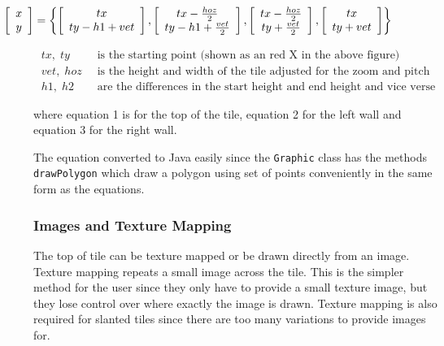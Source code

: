 \begin{equation}
\hspace{-2.5cm} \left[ \begin{array}{c} x \\ y \end{array} \right]=\left\{ \left[ \begin{array}{c} tx \\ ty-h1+vet \end{array} \right],\left[ \begin{array}{c} tx-\frac{hoz}{2} \\ ty-h1+\frac{vet}{2} \end{array} \right],\left[ \begin{array}{c} tx-\frac{hoz}{2} \\ ty+\frac{vet}{2} \end{array} \right],\left[ \begin{array}{c} tx \\ ty+vet \end{array} \right] \right\}
\end{equation}

\begin{align*}
	tx,\; ty   &\;\; \textrm{is the starting point (shown as an red X in the above figure)}\\
	vet,\; hoz &\;\; \textrm{is the height and width of the tile adjusted for  the zoom and pitch}\\
	h1,\; h2   &\;\; \textrm{are the differences in the start height and end height and vice verse}
\end{align*}

where equation 1 is for the top of the tile, equation 2 for the left wall and equation 3 for the right wall. 

The equation converted to Java easily since the \texttt{Graphic} class has the methods  \texttt{drawPolygon} which draw a polygon using set of points conveniently in the same form as the equations.

\subsubsection{Images and Texture Mapping}
The top of tile can be texture mapped or be drawn directly from an image.  Texture mapping repeats a small image across the tile. This is the simpler method for the user since they only have to provide a small texture image, but they lose control over where exactly the image is drawn.  Texture mapping is also required for slanted tiles since there are too many variations to provide images for.

